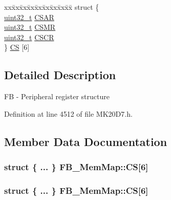 \begin{DoxyCompactItemize}
\begin{tabbing}
\end{tabbing}\item 
\begin{tabbing}
xx\=xx\=xx\=xx\=xx\=xx\=xx\=xx\=xx\=\kill
struct \{\\
\>\hyperlink{_p_e___types_8h_a33594304e786b158f3fb30289278f5af}{uint32\_t} \hyperlink{struct_f_b___mem_map_aa59ea1aff2f195dc7d41ef8611884381}{CSAR}\\
\>\hyperlink{_p_e___types_8h_a33594304e786b158f3fb30289278f5af}{uint32\_t} \hyperlink{struct_f_b___mem_map_a02c1e1542339e83d168a52e763f60228}{CSMR}\\
\>\hyperlink{_p_e___types_8h_a33594304e786b158f3fb30289278f5af}{uint32\_t} \hyperlink{struct_f_b___mem_map_a7a1e48a5fde6382a076243009f5c0846}{CSCR}\\
\} \hyperlink{struct_f_b___mem_map_a01b761d3509ca5c5edb785692645a257}{CS} \mbox{[}6\mbox{]}\\

\end{tabbing}\end{DoxyCompactItemize}


\subsection{Detailed Description}
FB -\/ Peripheral register structure 

Definition at line 4512 of file M\+K20\+D7.\+h.



\subsection{Member Data Documentation}
\subsubsection[{\texorpdfstring{CS}{CS}}]{\setlength{\rightskip}{0pt plus 5cm}struct \{ ... \}   F\+B\+\_\+\+Mem\+Map\+::\+CS\mbox{[}6\mbox{]}}\hypertarget{struct_f_b___mem_map_a4391acbc12cf84dd0dd3926949ac7976}{}\label{struct_f_b___mem_map_a4391acbc12cf84dd0dd3926949ac7976}
\subsubsection[{\texorpdfstring{CS}{CS}}]{\setlength{\rightskip}{0pt plus 5cm}struct \{ ... \}   F\+B\+\_\+\+Mem\+Map\+::\+CS\mbox{[}6\mbox{]}}\hypertarget{struct_f_b___mem_map_a070743eac7a6b7f9fdcdfeac7b1d543e}{}\label{struct_f_b___mem_map_a070743eac7a6b7f9fdcdfeac7b1d543e}
